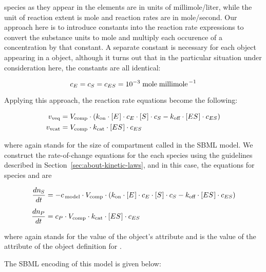 species as they appear in the \KineticLaw elements are in units of
\unit{millimole}/\unit{liter}, while the unit of reaction extent
is \unit{mole} and reaction rates are in
\unit{mole}/\unit{second}.  Our approach here is to introduce
constants into the reaction rate expressions to convert the
substance units to \unit{mole} and multiply each occurence of a
concentration by that constant.  A separate constant is necessary
for each \Species object appearing in a \KineticLaw object,
although it turns out that in the particular situation under
consideration here, the constants are all identical:
\begin{linenomath}
  \begin{equation*}
      c_E = c_S = c_{ES} = 10^{-3} \; \text{mole} \; \text{millimole}^{\,-1}
  \end{equation*}
\end{linenomath}
Applying this approach, the reaction rate equations become the
following:
\begin{linenomath}
  \begin{align*}
    v_\text{veq}  & = V_\text{comp} \cdot (k_\text{on} \cdot [E\mkern1mu] \cdot c_E \cdot [S\mkern1mu] \cdot c_S
    - k_\text{off} \cdot [ES\mkern1mu] \cdot c_{ES})\\
    v_\text{vcat} & = V_\text{comp} \cdot k_\text{cat} \cdot [ES\mkern1mu] \cdot c_{ES}
  \end{align*}
\end{linenomath}
where again \Vcomp stands for the size of compartment called
 in the SBML model.  We construct the rate-of-change
equations for the each species using the guidelines described in
Section~\ref{sec:about-kinetic-laws}, and in this case, the
equations for species  and  are
\begin{linenomath}
  \begin{align*}
    \dfrac{d n_{\mkern-1muS}}{d t} & = - c_{\,\textrm{model}} \cdot V_\text{comp} \cdot
    (k_\text{on} \cdot [E\mkern1mu] \cdot c_E \cdot [S\mkern1mu] \cdot c_S
    - k_\text{off} \cdot [ES\mkern1mu] \cdot c_{ES}) \\[5pt]
    \dfrac{d n_{\mkern-1muP}}{d t} & = c_P \cdot V_\text{comp} \cdot k_\text{cat} \cdot [ES\mkern1mu] \cdot c_{ES}
  \end{align*}
\end{linenomath}
where again \csg stands for the value of the \Model object's
 attribute and \convP is the value of the
 attribute of the \Species object
definition for .

The SBML encoding of this model is given below:

